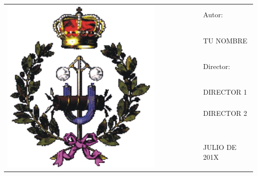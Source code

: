 \vspace{7mm}

\begin{tabular}{cccccccl}
 \multirow{11}{*}{\includegraphics[scale=1]{portada/etsii.jpg}}
 &  &  &  &  &  &  & Autor:\\
 &  &  &  &  &  &  & \\
 &  &  &  &  &  &  & TU NOMBRE\\
 &  &  &  &  &  &  & \\
 &  &  &  &  &  &  & Director: \\
 &  &  &  &  &  &  & \\
 &  &  &  &  &  &  & DIRECTOR 1 \\
 &  &  &  &  &  &  & DIRECTOR 2 \\
 &  &  &  &  &  &  & \\
 &  &  &  &  &  &  & \\
 &  &  &  &  &  &  & JULIO DE 201X
\end{tabular}

